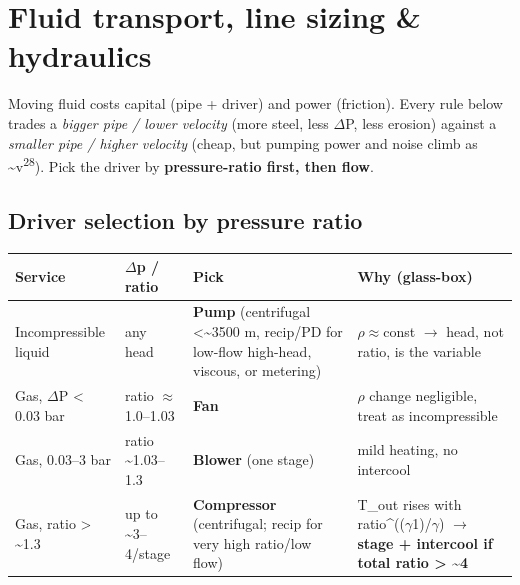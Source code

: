 \documentclass[11pt,a4paper]{article}
\begin{document}
\hypertarget{fluid-transport-line-sizing--hydraulics}{%
\section{Fluid transport, line sizing \&
hydraulics}\label{fluid-transport-line-sizing--hydraulics}}

Moving fluid costs capital (pipe + driver) and power (friction). Every
rule below trades a \emph{bigger pipe / lower velocity} (more steel,
less \(\Delta\)P, less erosion) against a \emph{smaller pipe / higher velocity}
(cheap, but pumping power and noise climb as \textasciitilde v\textsuperscript{2}\textperiodcentered{}\textsuperscript{8}). Pick
the driver by \textbf{pressure-ratio first, then flow}.

\hypertarget{driver-selection-by-pressure-ratio}{%
\subsection{Driver selection by pressure
ratio}\label{driver-selection-by-pressure-ratio}}

\begin{longtable}[]{@{}>{\raggedright\arraybackslash}p{\dimexpr(\linewidth-8\tabcolsep)/4\relax}>{\raggedright\arraybackslash}p{\dimexpr(\linewidth-8\tabcolsep)/4\relax}>{\raggedright\arraybackslash}p{\dimexpr(\linewidth-8\tabcolsep)/4\relax}>{\raggedright\arraybackslash}p{\dimexpr(\linewidth-8\tabcolsep)/4\relax}@{}}
\toprule\noalign{}
Service & \(\Delta\)p / ratio & Pick & Why (glass-box) \\
\midrule\noalign{}
\endhead
\bottomrule\noalign{}
\endlastfoot
Incompressible liquid & any head & \textbf{Pump} (centrifugal
\textless\textasciitilde3500 m, recip/PD for low-flow high-head,
viscous, or metering) & \(\rho\)\(\approx\)const \(\rightarrow\) head, not ratio, is the variable \\
Gas, \(\Delta\)P \textless{} 0.03 bar & ratio \(\approx\)1.0--1.03 & \textbf{Fan} & \(\rho\)
change negligible, treat as incompressible \\
Gas, 0.03--3 bar & ratio \textasciitilde1.03--1.3 & \textbf{Blower} (one
stage) & mild heating, no intercool \\
Gas, ratio \textgreater{} \textasciitilde1.3 & up to
\textasciitilde3--4/stage & \textbf{Compressor} (centrifugal; recip for
very high ratio/low flow) & T\_out rises with ratio\^{}((\(\gamma\)\textminus{}1)/\(\gamma\)) \(\rightarrow\)
\textbf{stage + intercool if total ratio \textgreater{}
\textasciitilde4} \\
\end{longtable}
\end{document}
